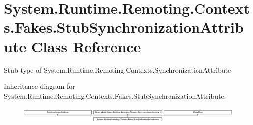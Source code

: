 \hypertarget{class_system_1_1_runtime_1_1_remoting_1_1_contexts_1_1_fakes_1_1_stub_synchronization_attribute}{\section{System.\-Runtime.\-Remoting.\-Contexts.\-Fakes.\-Stub\-Synchronization\-Attribute Class Reference}
\label{class_system_1_1_runtime_1_1_remoting_1_1_contexts_1_1_fakes_1_1_stub_synchronization_attribute}
}


Stub type of System.\-Runtime.\-Remoting.\-Contexts.\-Synchronization\-Attribute 


Inheritance diagram for System.\-Runtime.\-Remoting.\-Contexts.\-Fakes.\-Stub\-Synchronization\-Attribute\-:\begin{figure}[H]
\begin{center}
\leavevmode
\includegraphics[height=0.835198cm]{class_system_1_1_runtime_1_1_remoting_1_1_contexts_1_1_fakes_1_1_stub_synchronization_attribute}
\end{center}
\end{figure}
